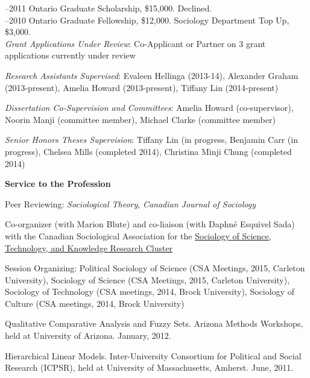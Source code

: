 \documentclass[9pt,usenames,dvipsnames]{article}
\begin{document}
–2011 Ontario Graduate Scholarship, \$15,000. Declined. \\

–2010 Ontario Graduate Fellowship, \$12,000. Sociology Department Top Up, \$3,000. \\

\noindent \emph{Grant Applications Under Review}: Co-Applicant or Partner on 3 grant applications currently under review \\ 


\ind \emph{Research Assistants Supervised}: Evaleen Hellinga (2013-14), Alexander Graham (2013-present), Amelia Howard (2013-present), Tiffany Lin (2014-present) 

\ind \emph{Dissertation Co-Supervision and Committees}: Amelia Howard (co-supervisor), Noorin Manji (committee member), Michael Clarke (committee member)

\ind \emph{Senior Honors Theses Supervision}: Tiffany Lin (in progress, Benjamin Carr (in progress), Chelsea Mills (completed 2014), Christina Minji Chung (completed 2014) \\


\ind \textbf{Service to the Profession}

\ind Peer Reviewing: {\it Sociological Theory}, {\it Canadian Journal of Sociology}

\ind Co-organizer (with Marion Blute) and co-liaison (with Daphné Esquivel Sada) with the Canadian Sociological Association for the \href{http://www.csa-scs.ca/files/webapps/csapress/sstk/}{Sociology of Science, Technology, and Knowledge Research Cluster}

\ind Session Organizing: Political Sociology of Science (CSA Meetings, 2015, Carleton University), Sociology of Science (CSA Meetings, 2015, Carleton University), Sociology of Technology (CSA meetings, 2014, Brock University), Sociology of Culture (CSA meetings, 2014, Brock University) \\


\ind Qualitative Comparative Analysis and Fuzzy Sets. Arizona Methods Workshops, held at University of Arizona. January, 2012.

\ind Hierarchical Linear Models. Inter-University Consortium for Political and Social Research (ICPSR), held at University of Massachusetts, Amherst. June, 2011.\\
\end{document}

